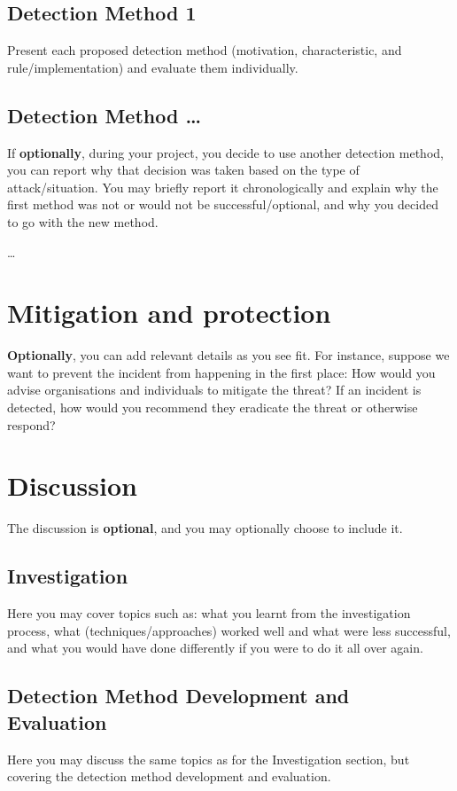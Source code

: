 \subsection{Detection Method 1}
Present each proposed detection method (motivation, characteristic, and rule/implementation) and evaluate them individually.


\subsection{Detection Method \ldots}
If \textbf{optionally}, during your project, you decide to use another detection method, you can report why that decision was taken based on the type of attack/situation. You may briefly report it chronologically and explain why the first method was not or would not be successful/optional, and why you decided to go with the new method.

\ldots

\section{Mitigation and protection}
\textbf{Optionally}, you can add relevant details as you see fit.
For instance, suppose we want to prevent the incident from happening in the first place: How would you advise organisations and individuals to mitigate the threat? If an incident is detected, how would you recommend they eradicate the threat or otherwise respond?

\section{Discussion} \label{section: discussion}

The discussion is \textbf{optional}, and you may optionally choose to include it.

\subsection{Investigation}
Here you may cover topics such as: what you learnt from the investigation process, what (techniques/approaches) worked well and what were less successful, and what you would have done differently if you were to do it all over again.

\subsection{Detection Method Development and Evaluation}
Here you may discuss the same topics as for the Investigation section, but covering the detection method development and evaluation.

